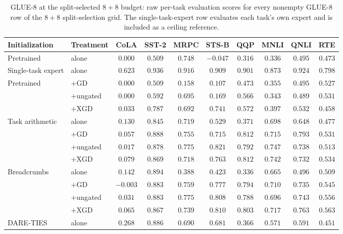 \documentclass{article} %
\begin{document}
\begin{table}[p]
\centering
\scriptsize
\setlength{\tabcolsep}{2.5pt}
\renewcommand{\arraystretch}{0.92}
\caption{GLUE-8 at the split-selected $8{+}8$ budget: raw per-task evaluation scores for every nonempty GLUE-8 row of the $8{+}8$ split-selection grid. The single-task-expert row evaluates each task's own expert and is included as a ceiling reference.}
\label{tab:glue8-n8-pertask}
\begin{tabular}{llcccccccc}
\toprule
Initialization & Treatment & CoLA & SST-2 & MRPC & STS-B & QQP & MNLI & QNLI & RTE \\
\midrule
Pretrained & alone & $0.000$ & $0.509$ & $0.748$ & $-0.047$ & $0.316$ & $0.336$ & $0.495$ & $0.473$ \\
Single-task expert & alone & $0.623$ & $0.936$ & $0.916$ & $0.909$ & $0.901$ & $0.873$ & $0.924$ & $0.798$ \\
\midrule
Pretrained & $+$GD & $0.000$ & $0.509$ & $0.158$ & $0.107$ & $0.473$ & $0.355$ & $0.495$ & $0.527$ \\
           & $+$ungated & $0.000$ & $0.592$ & $0.695$ & $0.169$ & $0.566$ & $0.343$ & $0.489$ & $0.531$ \\
           & $+$XGD & $0.033$ & $0.787$ & $0.692$ & $0.741$ & $0.572$ & $0.397$ & $0.532$ & $0.458$ \\
\midrule
Task arithmetic & alone & $0.130$ & $0.845$ & $0.719$ & $0.529$ & $0.371$ & $0.698$ & $0.648$ & $0.477$ \\
                & $+$GD & $0.057$ & $0.888$ & $0.755$ & $0.715$ & $0.812$ & $0.715$ & $0.793$ & $0.531$ \\
                & $+$ungated & $0.017$ & $0.878$ & $0.775$ & $0.821$ & $0.792$ & $0.747$ & $0.738$ & $0.513$ \\
                & $+$XGD & $0.079$ & $0.869$ & $0.718$ & $0.763$ & $0.812$ & $0.742$ & $0.732$ & $0.534$ \\
\midrule
Breadcrumbs & alone & $0.142$ & $0.894$ & $0.388$ & $0.423$ & $0.336$ & $0.665$ & $0.496$ & $0.509$ \\
            & $+$GD & $-0.003$ & $0.883$ & $0.759$ & $0.777$ & $0.794$ & $0.710$ & $0.735$ & $0.545$ \\
            & $+$ungated & $0.031$ & $0.883$ & $0.775$ & $0.808$ & $0.788$ & $0.696$ & $0.743$ & $0.556$ \\
            & $+$XGD & $0.065$ & $0.867$ & $0.739$ & $0.810$ & $0.803$ & $0.717$ & $0.763$ & $0.563$ \\
\midrule
DARE-TIES & alone & $0.268$ & $0.886$ & $0.690$ & $0.681$ & $0.366$ & $0.571$ & $0.591$ & $0.451$ \\

\end{tabular}
\end{table}
\end{document}
